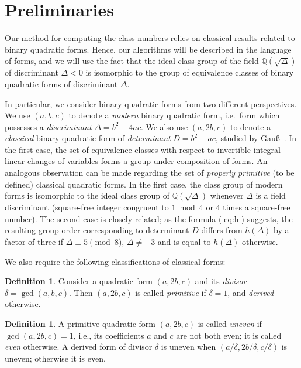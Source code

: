 \documentclass{mcom-l}
\theoremstyle{definition}
\newtheorem{defin}[thm]{Definition}
\begin{document}
\section{Preliminaries} \label{sec:preliminaries}

Our method for computing the class numbers relies on classical
results related to binary quadratic forms.  Hence, our algorithms will
be described in the language of forms, and we will use the fact that
the ideal class group of the field ${{\mathbb{{Q}}}}(\sqrt{\Delta})$ of discriminant
$\Delta < 0$ is isomorphic to the group of equivalence classes of
binary quadratic forms of discriminant $\Delta.$

In particular, we consider binary quadratic forms from two different
perspectives. We use $(a, b, c)$ to denote a \emph{modern} binary
quadratic form, i.e.\ form which possesses a \emph{discriminant}
$\Delta = b^2 - 4ac$. We also use $(a, 2b, c)$ to denote a
\emph{classical} binary quadratic form of \emph{determinant} $D = b^2
- ac$, studied by Gau\ss\, \cite[Chapter 5]{gauss}.  In the first case,
the set of equivalence classes with respect to invertible integral
linear changes of variables forms a group under composition of forms.
An analogous observation can be made regarding the set of \emph{properly
primitive} (to be defined) classical quadratic forms.
In the first case, the class group of modern forms is isomorphic to
the ideal class group of ${{\mathbb{{Q}}}}(\sqrt{\Delta})$ whenever $\Delta$ is a
field discriminant (square-free integer congruent to $1 \bmod 4$ or
$4$ times a square-free number).  The second case is closely related; 
as the formula (\ref{eq:h}) suggests, the resulting group order
corresponding to determinant $D$ differs from $h(\Delta)$ by a factor
of three if $\Delta \equiv 5 \pmod{8}$, $\Delta \neq -3$ and is equal to $h(\Delta)$
otherwise.

We also require the following classifications of classical forms:
\begin{defin} \label{defin:primitive_form} \emph{\cite[]{gauss}}
Consider a quadratic form $(a, 2b, c)$ and its \emph{divisor} $\delta
= \gcd(a, b, c)$. Then $(a, 2b, c)$ is called \emph{primitive} if
$\delta = 1$, and \emph{derived} otherwise.
\end{defin}

\begin{defin} \label{defin:proper_form} \emph{\cite{kronecker}}
A primitive quadratic form $(a, 2b, c)$ is called \emph{uneven} if
$\gcd(a, 2b, c) = 1$, i.e., its coefficients $a$ and $c$ are not both
even; it is called \emph{even} otherwise. A derived form of divisor
$\delta$ is uneven when $(a/\delta, 2b/\delta, c/\delta)$ is uneven;
otherwise it is even.
\end{defin}
\end{document}
